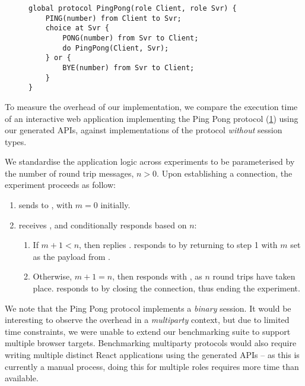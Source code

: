 \begin{figure}[!ht]
\begin{lstlisting}[language=Scribble]
global protocol PingPong(role Client, role Svr) {
	PING(number) from Client to Svr;
	choice at Svr {
		PONG(number) from Svr to Client;
		do PingPong(Client, Svr);
	} or {
		BYE(number) from Svr to Client;	
	}
}
\end{lstlisting}
\label{lst:pingpong}
\end{figure}

To measure the overhead of our implementation, we compare the
execution time of an interactive web application implementing the
Ping Pong protocol (\cref{lst:pingpong}) using our generated APIs,
against implementations of the protocol \textit{without} session types.

We standardise the application logic across experiments to be 
parameterised by the number of round trip messages, $n > 0$.
Upon establishing a connection, the experiment proceeds as follow:

\begin{enumerate}

\item {} sends  to , 
with $m = 0$ initially.

\item {} receives , and
conditionally responds based on $n$:

\begin{enumerate}
\item If $m + 1 < n$, then  replies .
 responds to  by returning to
step 1 with $m$ set as the payload from .

\item Otherwise, $m + 1 = n$, then  responds with 
, as $n$ round trips have taken place. 
 responds to  by 
closing the connection, thus ending the experiment.
\end{enumerate}

\end{enumerate}

We note that the Ping Pong protocol implements a \textit{binary} session. 
It would be interesting to observe the overhead in a \textit{multiparty}
context, but due to limited time constraints, we were unable to 
extend our benchmarking suite to support multiple browser targets.
Benchmarking multiparty protocols would also require writing multiple
distinct React applications using the generated APIs -- as this is currently
a manual process, doing this for multiple roles requires more time than
available.

